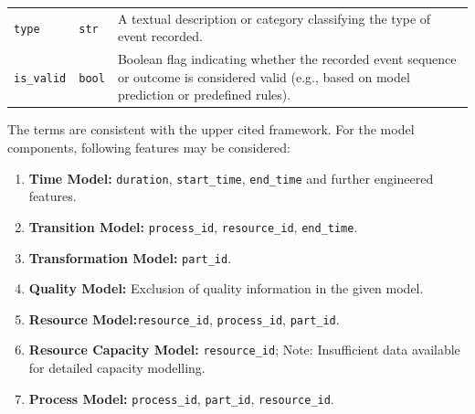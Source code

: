 \begin{table}[htbp]
\begin{tabular}{l l p{6cm}}
        \texttt{type}                   & \texttt{str}             & A textual description or category classifying the type of event recorded.                                                                         \\
        \texttt{is\_valid}              & \texttt{bool}            & Boolean flag indicating whether the recorded event sequence or outcome is considered valid (e.g., based on model prediction or predefined rules). \\
        \bottomrule
    \end{tabular}
\end{table}

The terms are consistent with the upper cited framework. For the model components, following features may be considered:

\begin{enumerate}
    \item \textbf{Time Model:} \texttt{duration}, \texttt{start\_time}, \texttt{end\_time} and further engineered features.

    \item \textbf{Transition Model:} \texttt{process\_id}, \texttt{resource\_id}, \texttt{end\_time}.

    \item \textbf{Transformation Model:} \texttt{part\_id}.

    \item \textbf{Quality Model:} Exclusion of quality information in the given model.

    \item \textbf{Resource Model:}\texttt{resource\_id}, \texttt{process\_id}, \texttt{part\_id}.

    \item \textbf{Resource Capacity Model:} \texttt{resource\_id}; Note: Insufficient data available for detailed capacity modelling.

    \item \textbf{Process Model:} \texttt{process\_id}, \texttt{part\_id}, \texttt{resource\_id}.
\end{enumerate}

